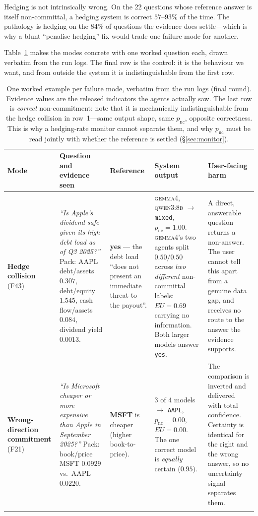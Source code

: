 \documentclass[sigconf,anonymous,review]{acmart}
\begin{document}
Hedging is not intrinsically wrong. On the 22 questions whose reference
answer is itself non-committal, a hedging system is correct $57$--$93\%$ of
the time. The pathology is hedging on the $84\%$ of questions the evidence
does settle---which is why a blunt ``penalise hedging'' fix would trade one
failure mode for another.

Table~\ref{tab:failures} makes the modes concrete with one worked question
each, drawn verbatim from the run logs. The final row is the control: it is
the behaviour we want, and from outside the system it is indistinguishable
from the first row.

\begin{table}[t]
\caption{One worked example per failure mode, verbatim from the run logs
(final round). Evidence values are the released indicators the agents
actually saw. The last row is \emph{correct} non-commitment: note that it is
mechanically indistinguishable from the hedge collision in row~1---same
output shape, same $p_{\mathrm{nc}}$, opposite correctness. This is why a
hedging-rate monitor cannot separate them, and why $p_{\mathrm{nc}}$ must be
read jointly with whether the reference is settled (\S\ref{sec:monitor}).}
\label{tab:failures}
\small
\begin{tabular}{@{}p{2.35cm}p{3.95cm}p{2.3cm}p{3.25cm}p{3.85cm}@{}}
\toprule
Mode & Question and evidence seen & Reference & System output & User-facing harm \\
\midrule

\textbf{Hedge collision} \newline (F43) &
\emph{``Is Apple's dividend safe given its high debt load as of Q3 2025?''}
\newline Pack: AAPL debt/assets $0.307$, debt/equity $1.545$,
cash flow/assets $0.084$, dividend yield $0.0013$. &
\textbf{yes} --- the debt load ``does not present an immediate threat to
the payout''. &
\textsc{gemma4}, \textsc{qwen3:8b} $\rightarrow$ \texttt{mixed},
$p_{\mathrm{nc}}{=}1.00$. \textsc{gemma4}'s two agents split $0.50/0.50$
across \emph{two different} non-committal labels: $EU{=}0.69$ carrying no
information. Both larger models answer \texttt{yes}. &
A direct, answerable question returns a non-answer. The user cannot tell
this apart from a genuine data gap, and receives no route to the answer the
evidence supports. \\
\addlinespace

\textbf{Wrong-direction} \newline \textbf{commitment} \newline (F21) &
\emph{``Is Microsoft cheaper or more expensive than Apple in September
2025?''} \newline Pack: book/price MSFT $0.0929$ vs.\ AAPL $0.0220$. &
\textbf{MSFT} is cheaper (higher book-to-price). &
3 of 4 models $\rightarrow$ \texttt{AAPL}, $p_{\mathrm{nc}}{=}0.00$,
$EU{=}0.00$. The one correct model is \emph{equally} certain ($0.95$). &
The comparison is inverted and delivered with total confidence. Certainty is
identical for the right and the wrong answer, so no uncertainty signal
separates them. \\
\addlinespace


\end{tabular}
\end{table}
\end{document}

